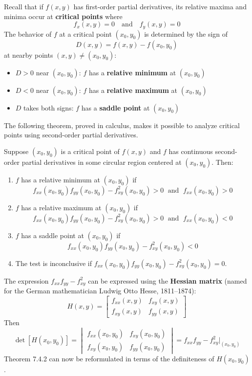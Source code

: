 \documentclass{article}
\begin{document}
Recall that if $f(x,y)$ has first-order partial derivatives, its relative maxima and minima
occur at \textbf{critical points} where
\[
  f_x(x,y)=0 \quad\text{and}\quad f_y(x,y)=0
\]
The behavior of $f$ at a critical point $(x_0,y_0)$ is determined by the sign of
\begin{equation}
  D(x,y)=f(x,y)-f(x_0,y_0) \tag{5}
\end{equation}
at nearby points $(x,y)\neq(x_0,y_0)$:
\begin{itemize}
  \item $D>0$ near $(x_0,y_0)$: $f$ has a \textbf{relative minimum} at $(x_0,y_0)$
  \item $D<0$ near $(x_0,y_0)$: $f$ has a \textbf{relative maximum} at $(x_0,y_0)$
  \item $D$ takes both signs: $f$ has a \textbf{saddle point} at $(x_0,y_0)$
\end{itemize}

The following theorem, proved in calculus, makes it possible to analyze critical points
using second-order partial derivatives.

\begin{tcolorbox}[colback=red!4, colframe=red!60!black,
  title={\textbf{Theorem 7.4.2 --- Second Derivative Test}}, boxrule=0.5mm, arc=3mm]
Suppose $(x_0,y_0)$ is a critical point of $f(x,y)$ and $f$ has continuous second-order
partial derivatives in some circular region centered at $(x_0,y_0)$. Then:
\begin{enumerate}
  \item[(a)] $f$ has a relative minimum at $(x_0,y_0)$ if
    \[f_{xx}(x_0,y_0)f_{yy}(x_0,y_0)-f_{xy}^2(x_0,y_0)>0 \;\text{ and }\; f_{xx}(x_0,y_0)>0\]
  \item[(b)] $f$ has a relative maximum at $(x_0,y_0)$ if
    \[f_{xx}(x_0,y_0)f_{yy}(x_0,y_0)-f_{xy}^2(x_0,y_0)>0 \;\text{ and }\; f_{xx}(x_0,y_0)<0\]
  \item[(c)] $f$ has a saddle point at $(x_0,y_0)$ if
    \[f_{xx}(x_0,y_0)f_{yy}(x_0,y_0)-f_{xy}^2(x_0,y_0)<0\]
  \item[(d)] The test is inconclusive if $f_{xx}(x_0,y_0)f_{yy}(x_0,y_0)-f_{xy}^2(x_0,y_0)=0$.
\end{enumerate}
\end{tcolorbox}

The expression $f_{xx}f_{yy}-f_{xy}^2$ can be expressed using the \textbf{Hessian matrix}
(named for the German mathematician Ludwig Otto Hesse, 1811--1874):
\[
  H(x,y) = \begin{bmatrix}f_{xx}(x,y)&f_{xy}(x,y)\\f_{xy}(x,y)&f_{yy}(x,y)\end{bmatrix}
\]
Then
\[
  \det[H(x_0,y_0)] = \begin{vmatrix}f_{xx}(x_0,y_0)&f_{xy}(x_0,y_0)\\f_{xy}(x_0,y_0)&f_{yy}(x_0,y_0)\end{vmatrix}
  = f_{xx}f_{yy}-f_{xy}^2\big|_{(x_0,y_0)}
\]
Theorem 7.4.2 can now be reformulated in terms of the definiteness of $H(x_0,y_0)$.
\end{document}
